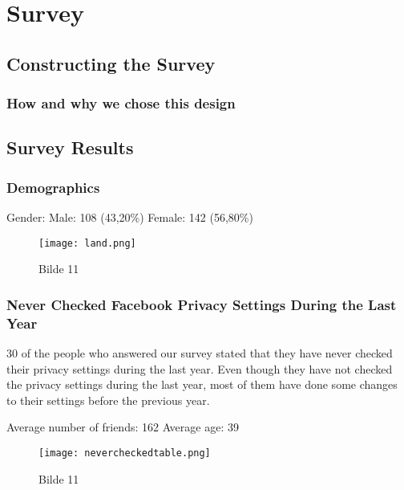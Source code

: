 \chapter{Survey}
\label{chp:amtsurvey} 

\section{Constructing the Survey}

\subsection{How and why we chose this design}

\section{Survey Results}

\subsection{Demographics}
Gender:
Male: 108 (43,20\%)
Female: 142 (56,80\%)

\begin{figure}[h!]
\centering
\texttt{[image: land.png]}
\caption[Bilde 1]{Bilde 11} 
\label{fig:co}
\end{figure}

\subsection{Never Checked Facebook Privacy Settings During the Last Year}
30 of the people who answered our survey stated that they have never checked their privacy settings during the last year. Even though they have not checked the privacy settings during the last year, most of them have done some changes to their settings before the previous year. 

Average number of friends: 162
Average age: 39

\begin{figure}[h!]
\centering
\texttt{[image: nevercheckedtable.png]}
\caption[Bilde 1]{Bilde 11} 
\label{fig:co}
\end{figure}

